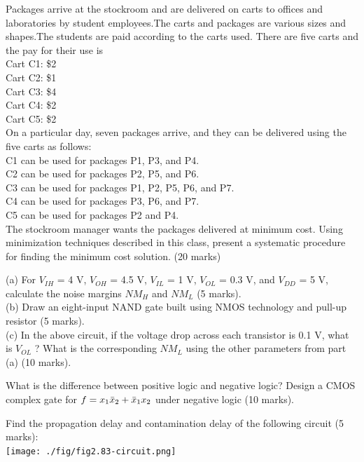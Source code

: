 \begin{prob}
  Packages arrive at the stockroom and are delivered on carts to offices and laboratories
  by student employees.The carts and packages are various sizes and shapes.The students
  are paid according to the carts used. There are five carts and the pay for their use is\\
  Cart C1: \$2\\
  Cart C2: \$1\\
  Cart C3: \$4\\
  Cart C4: \$2\\
  Cart C5: \$2\\
  On a particular day, seven packages arrive, and they can be delivered using the five
  carts as follows:\\
  C1 can be used for packages P1, P3, and P4. \\
  C2 can be used for packages P2, P5, and P6. \\
  C3 can be used for packages P1, P2, P5, P6, and P7. \\
  C4 can be used for packages P3, P6, and P7. \\
  C5 can be used for packages P2 and P4. \\
  The stockroom manager wants the packages delivered at minimum cost. Using
  minimization techniques described in this class, present a systematic procedure for
  finding the minimum cost solution. (20 marks)
\end{prob}

\begin{prob}
  (a) For $V_{IH}$ = 4 V, $V_{OH}$ = 4.5 V, $V_{IL}$ = 1 V, $V_{OL}$ = 0.3 V, and $V_{DD}$ = 5 V, calculate the
  noise margins $NM_H$ and $NM_L$ (5 marks).\\
  (b) Draw an eight-input NAND gate built using NMOS technology and pull-up
  resistor (5 marks).\\
  (c) In the above circuit, if the voltage drop
  across each transistor is 0.1 V, what is $V_{OL}$ ? What is the corresponding $NM_L$ using the other
  parameters from part (a) (10 marks).
\end{prob}

\begin{prob}
  What is the difference between positive logic and negative logic? Design a
  CMOS complex gate for $f = x_1 \bar{x}_2 + \bar{x}_1 x_2$ under negative logic (10 marks).
\end{prob}

\begin{prob}
  Find the propagation delay and contamination  delay of the following circuit (5 marks):\\
  \texttt{[image: ./fig/fig2.83-circuit.png]} 
\end{prob}

